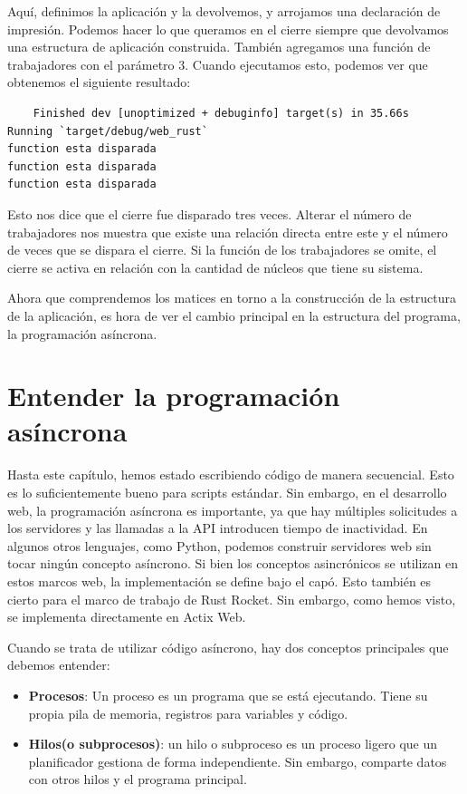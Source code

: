 Aquí, definimos la aplicación y la devolvemos, y arrojamos una declaración de impresión. Podemos hacer lo que queramos en el cierre siempre que devolvamos una estructura de aplicación construida. También agregamos una función de trabajadores con el parámetro 3. Cuando ejecutamos esto, podemos ver que obtenemos el siguiente resultado:

\begin{lstlisting}
    Finished dev [unoptimized + debuginfo] target(s) in 35.66s
Running `target/debug/web_rust`
function esta disparada
function esta disparada
function esta disparada
\end{lstlisting}


Esto nos dice que el cierre fue disparado tres veces. Alterar el número de trabajadores nos muestra que existe una relación directa entre este y el número de veces que se dispara el cierre. Si la función de los trabajadores se omite, el cierre se activa en relación con la cantidad de núcleos que tiene su sistema.

Ahora que comprendemos los matices en torno a la construcción de la estructura de la aplicación, es hora de ver el cambio principal en la estructura del programa, la programación asíncrona.

\section{Entender la programación asíncrona}

Hasta este capítulo, hemos estado escribiendo código de manera secuencial. Esto es lo suficientemente bueno para scripts estándar. Sin embargo, en el desarrollo web, la programación asíncrona es importante, ya que hay múltiples solicitudes a los servidores y las llamadas a la API introducen tiempo de inactividad. En algunos otros lenguajes, como Python, podemos construir servidores web sin tocar ningún concepto asíncrono. Si bien los conceptos asincrónicos se utilizan en estos marcos web, la implementación se define bajo el capó. Esto también es cierto para el marco de trabajo de Rust Rocket. Sin embargo, como hemos visto, se implementa directamente en Actix Web.

Cuando se trata de utilizar código asíncrono, hay dos conceptos principales que debemos entender:

\begin{itemize}
	\item \textbf{Procesos}: Un proceso es un programa que se está ejecutando. Tiene su propia pila de memoria, registros para variables y código.
	\item \textbf{Hilos(o subprocesos)}: un hilo o subproceso es un proceso ligero que un planificador gestiona de forma independiente. Sin embargo, comparte datos con otros hilos y el programa principal.
\end{itemize}



